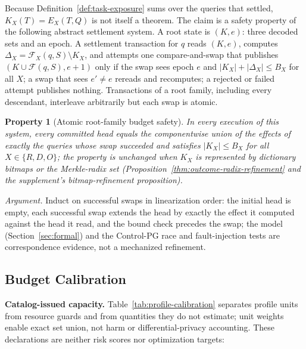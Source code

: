 \documentclass[10pt,journal,compsoc]{IEEEtran}
\newcommand{\code}[1]{\texttt{\detokenize{#1}}}
\newcommand{\facts}{\mathcal{F}}
\newtheorem{property}{Property}
\begin{document}
Because Definition~\ref{def:task-exposure} sums over the queries that
settled, $K_X(T)=E_X(T,Q)$ is not itself a theorem. The claim is a safety
property of the following abstract settlement system. A root state is
$(K,e)$: three decoded sets and an epoch. A settlement transaction for
$q$ reads $(K,e)$, computes $\Delta_X=\facts_X(q,S)\setminus K_X$, and
attempts one compare-and-swap that publishes $(K\cup\facts(q,S),e+1)$ only if
the swap sees epoch $e$ and $|K_X|+|\Delta_X|\le B_X$ for all $X$; a swap
that sees $e'\neq e$ rereads and recomputes; a rejected or failed attempt
publishes nothing. Transactions of a root family, including every
descendant, interleave arbitrarily but each swap is atomic.

\begin{property}[Atomic root-family budget safety]
\label{thm:root-family-safety}
In every execution of this system, every committed head equals the
componentwise union of the effects of exactly the queries whose swap
succeeded and satisfies $|K_X|\le B_X$ for all $X\in\{R,D,O\}$; the
property is unchanged when $K_X$ is represented by dictionary bitmaps or the
Merkle-radix set (Proposition~\ref{thm:outcome-radix-refinement} and the
supplement's bitmap-refinement proposition).
\end{property}
\emph{Argument.} Induct on successful swaps in linearization order: the
initial head is empty, each successful swap extends the head by exactly the
effect it computed against the head it read, and the bound check precedes
the swap; the \code{ExposureLedger} model (Section~\ref{sec:formal}) and
the Control-PG race and fault-injection tests are correspondence evidence,
not a mechanized refinement.

\subsection{Budget Calibration}
\label{sec:calibration}

\textbf{Catalog-issued capacity.} Table~\ref{tab:profile-calibration}
separates profile units from resource guards and from quantities they do
not estimate; unit weights enable exact set union, not harm or
differential-privacy accounting. These declarations are neither risk scores nor optimization targets:
\end{document}

